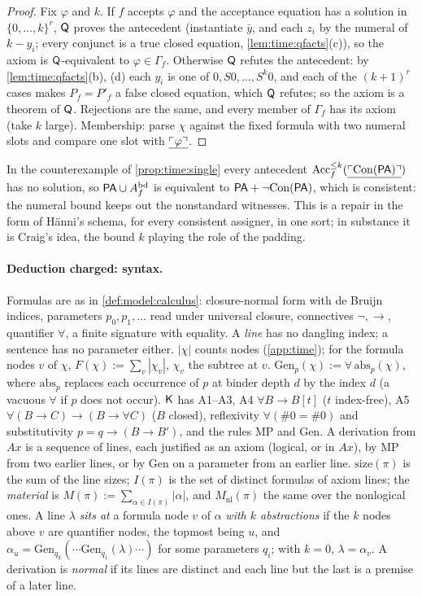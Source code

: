 \begin{proof}
Fix $\varphi$ and $k$. If $f$ accepts $\varphi$ and the acceptance equation has a solution in $\{0,\dots,k\}^r$, $\mathsf{Q}$ proves the antecedent (instantiate $\bar y$, and each $z_i$ by the numeral of $k-y_i$; every conjunct is a true closed equation, \cref{lem:time:qfacts}(c)), so the axiom is $\mathsf{Q}$-equivalent to $\varphi\in\Gamma_f$. Otherwise $\mathsf{Q}$ refutes the antecedent: by \cref{lem:time:qfacts}(b), (d) each $y_i$ is one of $0,S0,\dots,S^k0$, and each of the $(k+1)^r$ cases makes $P_f=P'_f$ a false closed equation, which $\mathsf{Q}$ refutes; so the axiom is a theorem of $\mathsf{Q}$. Rejections are the same, and every member of $\Gamma_f$ has its axiom (take $k$ large). Membership: parse $\chi$ against the fixed formula with two numeral slots and compare one slot with $\underline{\ulcorner \varphi\urcorner}$.
\end{proof}

\noindent In the counterexample of \cref{prop:time:single} every antecedent $\mathrm{Acc}^{\le k}_f(\underline{\ulcorner \mathrm{Con}(\mathsf{PA})\urcorner})$ has no solution, so $\mathsf{PA}\cup A^{\mathrm{bd}}_f$ is equivalent to $\mathsf{PA}+\neg\mathrm{Con}(\mathsf{PA})$, which is consistent: the numeral bound keeps out the nonstandard witnesses. This is a repair in the form of H\"anni's schema, for every consistent assigner, in one sort; in substance it is Craig's idea, the bound $k$ playing the role of the padding.

\paragraph{Deduction charged: syntax.} Formulas are as in \cref{def:model:calculus}: closure-normal form with de Bruijn indices, parameters $p_0,p_1,\dots$ read under universal closure, connectives $\neg,\to$, quantifier $\forall$, a finite signature with equality. A \emph{line} has no dangling index; a sentence has no parameter either. $|\chi|$ counts nodes (\cref{app:time}); for the formula nodes $v$ of $\chi$, $F(\chi):=\sum_v|\chi_v|$, $\chi_v$ the subtree at $v$. $\mathrm{Gen}_p(\chi):=\forall\,\mathrm{abs}_p(\chi)$, where $\mathrm{abs}_p$ replaces each occurrence of $p$ at binder depth $d$ by the index $d$ (a vacuous $\forall$ if $p$ does not occur). $\mathsf{K}$ has A1--A3, A4 $\forall B\to B[t]$ ($t$ index-free), A5 $\forall(B\to C)\to(B\to\forall C)$ ($B$ closed), reflexivity $\forall(\#0=\#0)$ and substitutivity $p=q\to(B\to B')$, and the rules MP and Gen. A derivation from $Ax$ is a sequence of lines, each justified as an axiom (logical, or in $Ax$), by MP from two earlier lines, or by Gen on a parameter from an earlier line. $\mathrm{size}(\pi)$ is the sum of the line sizes; $I(\pi)$ is the set of distinct formulas of axiom lines; the \emph{material} is $M(\pi):=\sum_{\alpha\in I(\pi)}|\alpha|$, and $M_{\mathrm{nl}}(\pi)$ the same over the nonlogical ones. A line $\lambda$ \emph{sits at} a formula node $v$ of $\alpha$ \emph{with $k$ abstractions} if the $k$ nodes above $v$ are quantifier nodes, the topmost being $u$, and $\alpha_u=\mathrm{Gen}_{q_k}(\cdots\mathrm{Gen}_{q_1}(\lambda)\cdots)$ for some parameters $q_i$; with $k=0$, $\lambda=\alpha_v$. A derivation is \emph{normal} if its lines are distinct and each line but the last is a premise of a later line.

